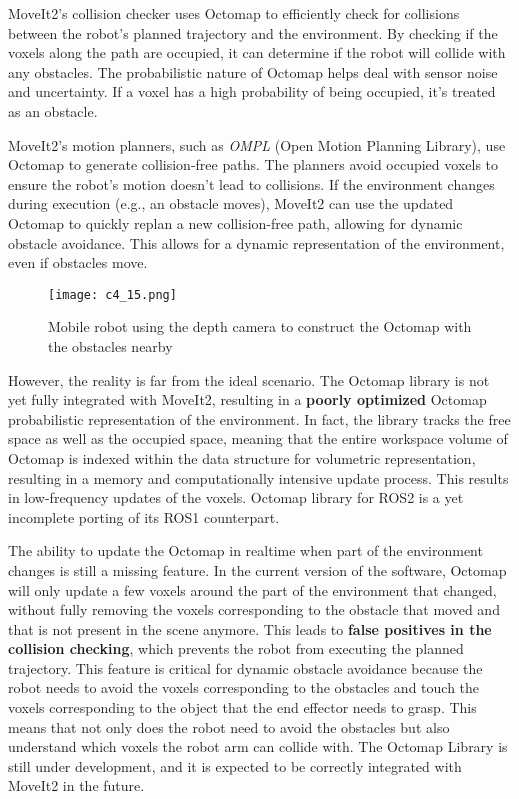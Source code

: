 MoveIt2's collision checker uses Octomap to efficiently check for collisions between the robot's planned trajectory
and the environment. By checking if the voxels along the path are occupied, it can determine if the robot will collide 
with any obstacles. The probabilistic nature of Octomap helps deal with sensor noise and uncertainty. 
If a voxel has a high probability of being occupied, it's treated as an obstacle.

MoveIt2's motion planners, such as \textit{OMPL} (Open Motion Planning Library), use Octomap
to generate collision-free paths. The planners avoid occupied voxels to ensure the robot's motion doesn't lead to collisions.
If the environment changes during execution (e.g., an obstacle moves), MoveIt2 can use the updated Octomap 
to quickly replan a new collision-free path, allowing for dynamic obstacle avoidance.
This allows for a dynamic representation of the environment, even if obstacles move.

\begin{figure}[t]
    \centering
    \texttt{[image: c4\_15.png]}
    \caption{Mobile robot using the depth camera to construct the Octomap with the obstacles nearby}
    \label{fig:octomap}
\end{figure}

However, the reality is far from the ideal scenario. The Octomap library is not yet fully integrated with MoveIt2,
resulting in a \textbf{poorly optimized} Octomap probabilistic representation of the environment.
In fact, the library tracks the free space as well as the occupied space, meaning that the entire workspace volume
of Octomap is indexed within the data structure for volumetric representation, resulting in a memory and computationally
intensive update process. This results in low-frequency updates of the voxels. Octomap
library for ROS2 is a yet incomplete porting of its ROS1 counterpart.

The ability to update the Octomap in realtime when part of the environment changes is still a missing feature.
In the current version of the software, Octomap will only update a few voxels around the
part of the environment that changed, without fully removing the voxels corresponding to the obstacle that moved
and that is not present in the scene anymore. This leads to \textbf{false positives in the collision checking}, which
prevents the robot from executing the planned trajectory. This feature is critical for dynamic obstacle avoidance
because the robot needs to avoid the voxels corresponding to the obstacles and touch the voxels corresponding
to the object that the end effector needs to grasp. This means that not only does the robot need to avoid the obstacles
but also understand which voxels the robot arm can collide with.
The Octomap Library is still under development, and it is expected to be correctly integrated with MoveIt2 in the future.

